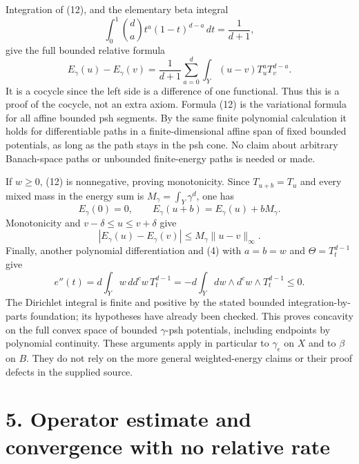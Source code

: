 \documentclass[
  11pt,
]{article}
\begin{document}
Integration of (12), and the elementary beta integral \[
\int_0^1\binom da t^a(1-t)^{d-a}\,dt=\frac1{d+1},
\] give the full bounded relative formula \[
E_\gamma(u)-E_\gamma(v)
=\frac1{d+1}\sum_{a=0}^d\int_Y(u-v)T_u^aT_v^{d-a}.                  \tag{13}
\] It is a cocycle since the left side is a difference of one functional. Thus this is a proof of the cocycle, not an extra axiom. Formula (12) is the variational formula for all affine bounded psh segments. By the same finite polynomial calculation it holds for differentiable paths in a finite-dimensional affine span of fixed bounded potentials, as long as the path stays in the psh cone. No claim about arbitrary Banach-space paths or unbounded finite-energy paths is needed or made.

If \(w\geq0\), (12) is nonnegative, proving monotonicity. Since \(T_{u+b}=T_u\) and every mixed mass in the energy sum is \(M_\gamma=\int_Y\gamma^d\), one has \[
E_\gamma(0)=0,\qquad E_\gamma(u+b)=E_\gamma(u)+bM_\gamma.             \tag{14}
\] Monotonicity and \(v-\delta\leq u\leq v+\delta\) give \[
|E_\gamma(u)-E_\gamma(v)|\leq M_\gamma\|u-v\|_\infty.                \tag{15}
\] Finally, another polynomial differentiation and (4) with \(a=b=w\) and \(\Theta=T_t^{d-1}\) give \[
e''(t)=d\int_Y w\,dd^c w\,T_t^{d-1}
=-d\int_Ydw\wedge d^cw\wedge T_t^{d-1}\leq0.                       \tag{16}
\] The Dirichlet integral is finite and positive by the stated bounded integration-by-parts foundation; its hypotheses have already been checked. This proves concavity on the full convex space of bounded \(\gamma\)-psh potentials, including endpoints by polynomial continuity. These arguments apply in particular to \(\gamma_\epsilon\) on \(X\) and to \(\beta\) on \(B\). They do not rely on the more general weighted-energy claims or their proof defects in the supplied source.

\section{5. Operator estimate and convergence with no relative rate}\label{operator-estimate-and-convergence-with-no-relative-rate}
\end{document}
